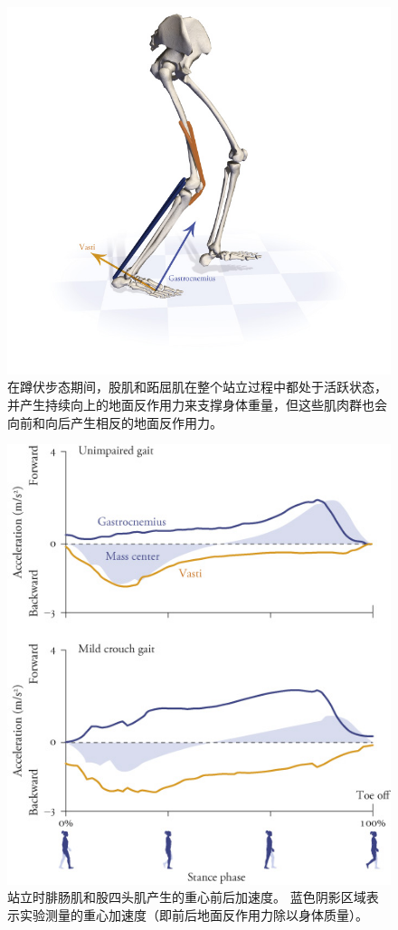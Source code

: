 \begin{figure}[!htb]
	\centering
	\includegraphics[width=1.0\linewidth]{chap11/11_13}
	\caption{在蹲伏步态期间，股肌和跖屈肌在整个站立过程中都处于活跃状态，并产生持续向上的地面反作用力来支撑身体重量，但这些肌肉群也会向前和向后产生相反的地面反作用力。 \label{fig:11_13}}
\end{figure}


\begin{figure}[!htb]
	\centering
	\includegraphics[width=0.9\linewidth]{chap11/11_14}
	\caption{站立时腓肠肌和股四头肌产生的重心前后加速度。
		蓝色阴影区域表示实验测量的重心加速度（即前后地面反作用力除以身体质量）\cite{steele2013muscle}。 \label{fig:11_14}}
\end{figure}


